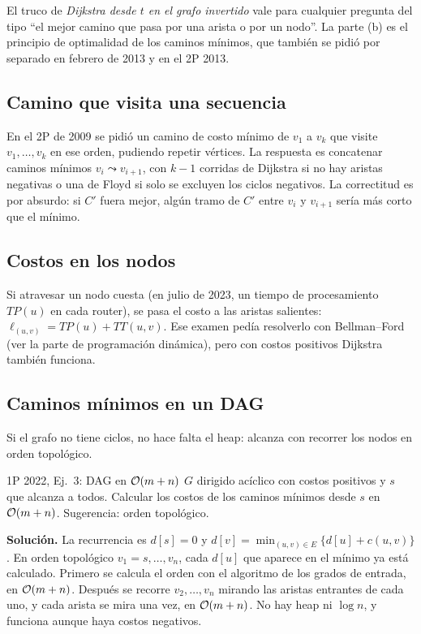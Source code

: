 El truco de \emph{Dijkstra desde $t$ en el grafo invertido} vale para cualquier pregunta del tipo ``el mejor camino que pasa por una arista o por un nodo''. La parte (b) es el principio de optimalidad de los caminos mínimos, que también se pidió por separado en febrero de 2013 y en el 2P 2013.

\subsection{Camino que visita una secuencia}

En el 2P de 2009 se pidió un camino de costo mínimo de $v_1$ a $v_k$ que visite $v_1,\dots,v_k$ en ese orden, pudiendo repetir vértices. La respuesta es concatenar caminos mínimos $v_i\leadsto v_{i+1}$, con $k-1$ corridas de Dijkstra si no hay aristas negativas o una de Floyd si solo se excluyen los ciclos negativos. La correctitud es por absurdo: si $C'$ fuera mejor, algún tramo de $C'$ entre $v_i$ y $v_{i+1}$ sería más corto que el mínimo.

\subsection{Costos en los nodos}

Si atravesar un nodo cuesta (en julio de 2023, un tiempo de procesamiento $TP(u)$ en cada router), se pasa el costo a las aristas salientes: $\ell_{(u,v)}=TP(u)+TT(u,v)$. Ese examen pedía resolverlo con Bellman–Ford (ver la parte de programación dinámica), pero con costos positivos Dijkstra también funciona.

\subsection{Caminos mínimos en un DAG}\label{gr:dag}

Si el grafo no tiene ciclos, no hace falta el heap: alcanza con recorrer los nodos en orden topológico.

\begin{problema}{1P 2022, Ej.~3: DAG en $\mathcal{O}(m+n)$}
$G$ dirigido acíclico con costos positivos y $s$ que alcanza a todos. Calcular los costos de los caminos mínimos desde $s$ en $\mathcal{O}(m+n)$. Sugerencia: orden topológico.

\smallskip
\textbf{Solución.} La recurrencia es $d[s]=0$ y $d[v]=\min_{(u,v)\in E}\{d[u]+c(u,v)\}$. En orden topológico $v_1=s,\dots,v_n$, cada $d[u]$ que aparece en el mínimo ya está calculado. Primero se calcula el orden con el algoritmo de los grados de entrada, en $\mathcal{O}(m+n)$. Después se recorre $v_2,\dots,v_n$ mirando las aristas entrantes de cada uno, y cada arista se mira una vez, en $\mathcal{O}(m+n)$. No hay heap ni $\log n$, y funciona aunque haya costos negativos.
\end{problema}


